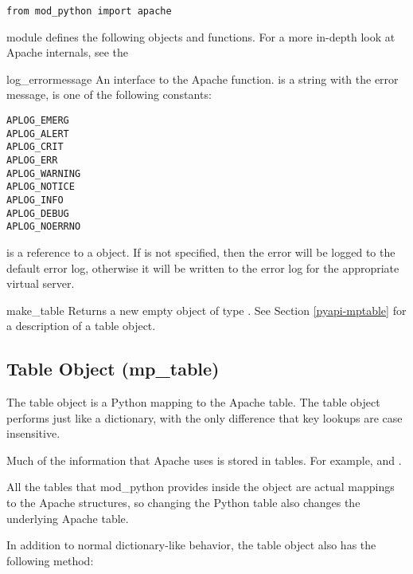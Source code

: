 \begin{verbatim}
from mod_python import apache
\end{verbatim}

 module defines the following objects and
functions. For a more in-depth look at Apache internals, see the

\begin{funcdesc}{log_error}{message}
An interface to the Apache
function.  is a string with the error message,  is
one of the following constants:

\begin{verbatim}
APLOG_EMERG
APLOG_ALERT
APLOG_CRIT
APLOG_ERR
APLOG_WARNING
APLOG_NOTICE
APLOG_INFO
APLOG_DEBUG
APLOG_NOERRNO
\end{verbatim}            
      
 is a reference to a  object. If
 is not specified, then the error will be logged to the default
error log, otherwise it will be written to the error log for the
appropriate virtual server.
\end{funcdesc}

\begin{funcdesc}{make_table}{}
Returns a new empty object of type . See Section \ref{pyapi-mptable}
for a description of a table object. 
\end{funcdesc}

\subsection{Table Object (mp_table)\label{pyapi-mptable}}

The table object is a Python mapping to the Apache table. The table
object performs just like a dictionary, with the only difference that
key lookups are case insensitive.

Much of the information that Apache uses is stored in tables. For
example,  and .

All the tables that mod_python provides inside the 
object are actual mappings to the Apache structures, so changing the
Python table also changes the underlying Apache table.

In addition to normal dictionary-like behavior, the table object also
has the following method:

